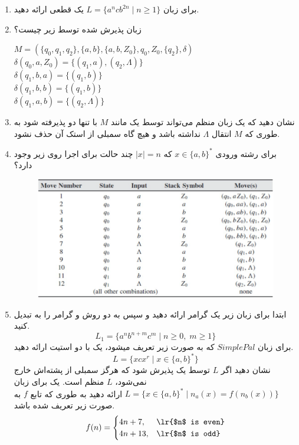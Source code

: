 \begin{enumerate}
		\item 
		برای زبان $L = \{a^ncb^{2n}\;|\;n\geq 1\}$ یک  قطعی ارائه دهید.
			
			\item 
			زبان پذیرش شده توسط  زیر چیست؟
			\begin{flushleft}
				$M = (\{q_0,q_1,q_2\},\{a,b\},\{a,b,Z_0\},q_0,Z_0,\{q_2\},\delta)$
				\\ $\delta(q_0,a,Z_0)=\{(q_1,a),(q_2,\Lambda)\}$
				\\ $\delta(q_1,b,a)=\{(q_1,b)\}$
				\\ $\delta(q_1,b,b)=\{(q_1,b)\}$
				\\ $\delta(q_1,a,b)=\{(q_2,\Lambda)\}$
			\end{flushleft}

			\item 
			نشان دهید که یک زبان منظم می‌تواند توسط یک  مانند $M$ با تنها دو  پذیرفته شود به طوری که $M$ انتقال $\Lambda$ نداشته باشد و هیچ گاه سمبلی از استک آن حذف نشود.
			
			\item
			برای رشته ورودی 
			$x \in \{a,b\}^*$
			که
			$|x|=n$
			چند حالت برای اجرا روی  زیر وجود دارد؟
			\begin{figure}[h]
				\centering
				\includegraphics[width=0.9\linewidth]{image1}
			\end{figure}
			\item
			ابتدا برای زبان زیر یک گرامر ارائه دهید و سپس به دو روش  و  گرامر را به  تبدیل کنید.
			$$L_1 = \{a^nb^{n+m}c^m \;|\; n \geq 0, \; m \geq1\}$$
			\CircledEnumi
			برای زبان $ SimplePal $ که به صورت زیر تعریف میشود، یک  با دو استیت ارائه دهید.
$$L = \{xcx^r \;|\; x \in \{a,b\}^*\}$$
			\CircledEnumi
نشان دهید اگر $L$ توسط یک  پذیرش شود که هرگز سمبلی از پشته‌اش خارج نمی‌شود، $L$ منظم است.
			\CircledEnumi
			یک  برای زبان 
			$L = \{x \in \{a,b\}^* \;|\; n_a(x)=f(n_b(x))\}$
			 ارائه دهید به طوری که تابع $f$ به صورت زیر تعریف شده باشد.
			$$f(n) = \begin{cases}
				4n+7, & \text{\lr{$n$ is even}} \\
				4n+13, & \text{\lr{$n$ is odd}}
			\end{cases} $$ 
		

\end{enumerate}
